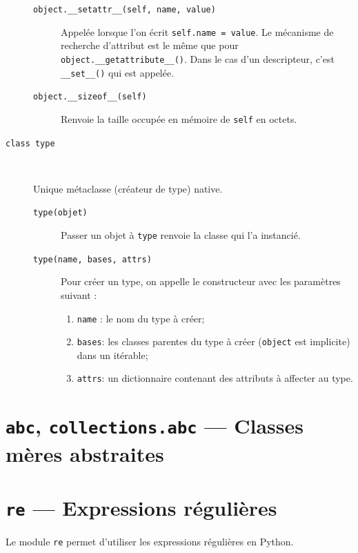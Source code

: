 \documentclass[a4paper, 10pt]{article}
\begin{document}
\begin{description}
\begin{description}
        \item[\texttt{object.__setattr__(self, name, value)}] Appelée lorsque l'on écrit \texttt{self.name = value}. Le mécanisme de recherche d'attribut est le même que pour \texttt{object.__getattribute__()}. Dans le cas d'un descripteur, c'est \texttt{__set__()} qui est appelée.
        \item[\texttt{object.__sizeof__(self)}] Renvoie la taille occupée en mémoire de \texttt{self} en octets. 
    \end{description}

    \item[\texttt{class type}]~
    
    Unique métaclasse (créateur de type) native.
    
    \begin{description}
        \item[\texttt{type(objet)}] Passer un objet à \texttt{type} renvoie la classe qui l'a instancié.
        \item[\texttt{type(name, bases, attrs)}] Pour créer un type, on appelle le constructeur avec les paramètres suivant :
        \begin{enumerate}
            \item \texttt{name} : le nom du type à créer;
            \item \texttt{bases}: les classes parentes du type à créer (\texttt{object} est implicite) dans un itérable;
            \item \texttt{attrs}: un dictionnaire contenant des attributs à affecter au type.
        \end{enumerate}
    \end{description}
\end{description}

\section[{\footnotesize\texttt{abc}}, {\footnotesize\texttt{collections.abc}} --- Classes mères abstraites]{{\normalfont\bfseries\large\texttt{abc}}, {\normalfont\bfseries\large\texttt{collections.abc}} --- Classes mères abstraites}\label{abc}

\section[{\footnotesize\texttt{re}} --- Expressions régulières]{{\normalfont\bfseries\large\texttt{re}} --- Expressions régulières}
Le module \texttt{re}  permet d'utiliser les expressions régulières en Python.
\end{document}
